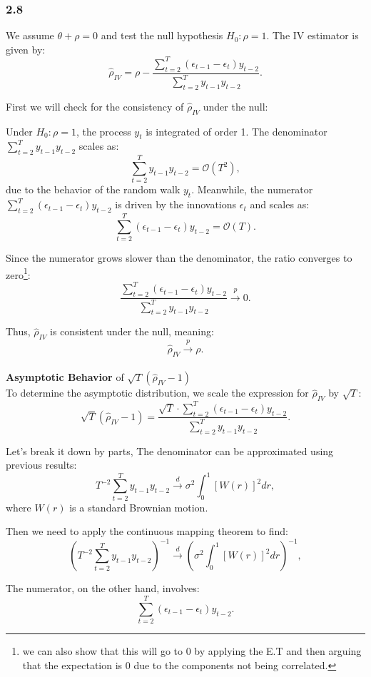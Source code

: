 \documentclass{article}
\begin{document}
\subsubsection*{2.8}
We assume \(\theta + \rho = 0\) and test the null hypothesis \(H_0: \rho = 1\). The IV estimator is given by:
\[
\hat{\rho}_{IV} = \rho - \frac{\sum_{t=2}^T (\epsilon_{t-1} - \epsilon_t)y_{t-2}}{\sum_{t=2}^T y_{t-1}y_{t-2}}.
\]

First we will check for the consistency of \(\hat{\rho}_{IV}\) under the null:

Under \(H_0: \rho = 1\), the process \(y_t\) is integrated of order 1. The denominator \(\sum_{t=2}^T y_{t-1}y_{t-2}\) scales as:
\[
\sum_{t=2}^T y_{t-1}y_{t-2} = \mathcal{O}(T^2),
\]
due to the behavior of the random walk \(y_t\). Meanwhile, the numerator \(\sum_{t=2}^T (\epsilon_{t-1} - \epsilon_t)y_{t-2}\) is driven by the innovations \(\epsilon_t\) and scales as:
\[
\sum_{t=2}^T (\epsilon_{t-1} - \epsilon_t)y_{t-2} = \mathcal{O}(T).
\]

Since the numerator grows slower than the denominator, the ratio converges to zero\footnote{we can also show that this will go to 0 by applying the E.T and then arguing that the expectation is 0 due to the components not being correlated.}:
\[
\frac{\sum_{t=2}^T (\epsilon_{t-1} - \epsilon_t)y_{t-2}}{\sum_{t=2}^T y_{t-1}y_{t-2}} \overset{p}{\to} 0.
\]

Thus, \(\hat{\rho}_{IV}\) is consistent under the null, meaning:
\[
\hat{\rho}_{IV} \overset{p}{\to} \rho.
\]\\

\textbf{Asymptotic Behavior} of \(\sqrt{T}(\hat{\rho}_{IV} - 1)\) \\

To determine the asymptotic distribution, we scale the expression for \(\hat{\rho}_{IV}\) by \(\sqrt{T}\):
\[
\sqrt{T}(\hat{\rho}_{IV} - 1) = \frac{\sqrt{T} \cdot \sum_{t=2}^T (\epsilon_{t-1} - \epsilon_t)y_{t-2}}{\sum_{t=2}^T y_{t-1}y_{t-2}}.
\]


Let's break it down by parts, 
The denominator can be approximated using previous results:
\[
T^{-2} \sum_{t=2}^T y_{t-1}y_{t-2} \overset{d}{\to} \sigma^2 \int_0^1 [W(r)]^2 dr,
\]
where \(W(r)\) is a standard Brownian motion. 

Then we need to apply the continuous mapping theorem to find:
\[
(T^{-2} \sum_{t=2}^T y_{t-1}y_{t-2})^{-1} \overset{d}{\to} (\sigma^2 \int_0^1 [W(r)]^2 dr)^{-1},
\]


The numerator, on the other hand, involves:
\[
\sum_{t=2}^T (\epsilon_{t-1} - \epsilon_t)y_{t-2}.
\]
\end{document}
